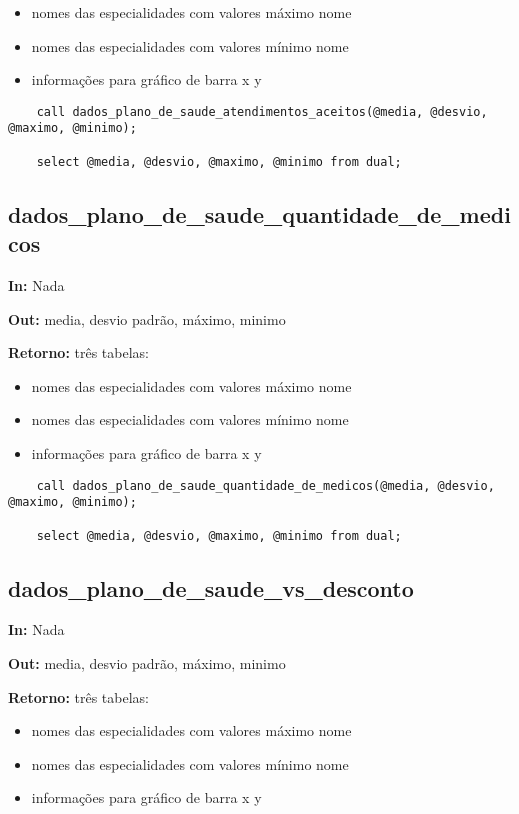 \begin{itemize}
	\item nomes das especialidades com valores máximo
	\subitem nome
	\item nomes das especialidades com valores mínimo
	\subitem nome
	\item informações para gráfico de barra
	\subitem x
	\subitem y
\end{itemize}

\begin{verbatim}
	call dados_plano_de_saude_atendimentos_aceitos(@media, @desvio, @maximo, @minimo);
	
	select @media, @desvio, @maximo, @minimo from dual;
\end{verbatim}

\subsection{dados\_plano\_de\_saude\_quantidade\_de\_medicos}

\textbf{In:} Nada

\textbf{Out:} media, desvio padrão, máximo, minimo

\textbf{Retorno:} três tabelas:

\begin{itemize}
	\item nomes das especialidades com valores máximo
	\subitem nome
	\item nomes das especialidades com valores mínimo
	\subitem nome
	\item informações para gráfico de barra
	\subitem x
	\subitem y
\end{itemize}

\begin{verbatim}
	call dados_plano_de_saude_quantidade_de_medicos(@media, @desvio, @maximo, @minimo);
	
	select @media, @desvio, @maximo, @minimo from dual;
\end{verbatim}

\subsection{dados\_plano\_de\_saude\_vs\_desconto}

\textbf{In:} Nada

\textbf{Out:} media, desvio padrão, máximo, minimo

\textbf{Retorno:} três tabelas:

\begin{itemize}
	\item nomes das especialidades com valores máximo
	\subitem nome
	\item nomes das especialidades com valores mínimo
	\subitem nome
	\item informações para gráfico de barra
	\subitem x
	\subitem y
\end{itemize}

